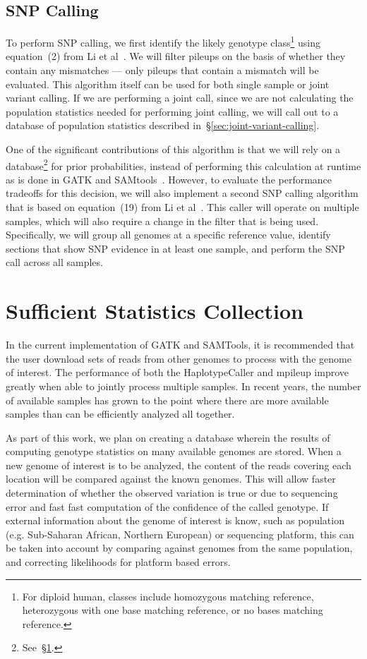 \documentclass[11pt]{article}
\begin{document}
\subsection{SNP Calling}
\label{sec:SNP-calling}

To perform SNP calling, we first identify the likely genotype class\footnote{For diploid human, classes include homozygous
matching reference, heterozygous with one base matching reference, or no bases matching reference.} using equation~(2)
from Li et al~\cite{li11}. We will filter pileups on the basis of whether they contain any mismatches --- only pileups that contain
a mismatch will be evaluated. This algorithm itself can be used for both single sample or joint variant calling. If we are performing
a joint call, since we are not calculating the population statistics needed for performing joint calling, we will call out to a database
of population statistics described in~\S\ref{sec:joint-variant-calling}.

One of the significant contributions of this algorithm is that we will rely on a database\footnote{See~\S\ref{sec:sufficient-statistics}.}
for prior probabilities, instead of performing this calculation at runtime as is done in GATK and SAMtools~\cite{mckenna10, li11}.
However, to evaluate the performance tradeoffs for this decision, we will also implement a second SNP calling algorithm that is
based on equation~(19) from Li et al~\cite{li11}. This caller will operate on multiple samples, which will also require a change in
the filter that is being used. Specifically, we will group all genomes at a specific reference value, identify sections that show SNP
evidence in at least one sample, and perform the SNP call across all samples.

\section{Sufficient Statistics Collection}
\label{sec:sufficient-statistics}

In the current implementation of GATK and SAMTools, it is recommended that the user download sets of reads from other genomes
to process with the genome of interest. The performance of both the HaplotypeCaller and mpileup improve greatly when able
to jointly process multiple samples. In recent years, the number of available samples has grown to the point where there are
more available samples than can be efficiently analyzed all together.

As part of this work, we plan on creating a database wherein the results of computing genotype statistics on many available genomes
are stored. When a new genome of interest is to be analyzed, the content of the reads covering each location will be compared against
the known genomes. This will allow faster determination of whether the observed variation is true or due to sequencing error and
fast fast computation of the confidence of the called genotype. If external information about the genome of interest is know, such as
population (e.g. Sub-Saharan African, Northern European) or sequencing platform, this can be taken into account by comparing
against genomes from the same population, and correcting likelihoods for platform based errors. 
\end{document}
